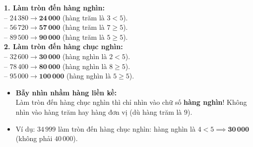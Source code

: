 \documentclass[11pt,a4paper]{article}
\begin{document}
\vspace{-2.5mm}
\noindent
\begin{minipage}[t]{0.49\textwidth}\vspace{0pt}
\begin{tcolorbox}[
  enhanced,
  colback=green!4!white,
  colframe=green!60!black,
  arc=2mm, boxrule=0.8pt,
  left=2mm, right=2mm, top=1.8mm, bottom=1.8mm,
  title={\footnotesize\bfseries\color{white}\faCheckCircle\ Ví dụ thực hành chuẩn mực}
]
{\footnotesize
\textbf{1. Làm tròn đến hàng nghìn:}\\
-- $24\,380 \to \mathbf{24\,000}$ (hàng trăm là $3 < 5$).\\
-- $56\,720 \to \mathbf{57\,000}$ (hàng trăm là $7 \ge 5$).\\
-- $89\,500 \to \mathbf{90\,000}$ (hàng trăm là $5 \ge 5$).\\
\textbf{2. Làm tròn đến hàng chục nghìn:}\\
-- $32\,600 \to \mathbf{30\,000}$ (hàng nghìn là $2 < 5$).\\
-- $78\,400 \to \mathbf{80\,000}$ (hàng nghìn là $8 \ge 5$).\\
-- $95\,000 \to \mathbf{100\,000}$ (hàng nghìn là $5 \ge 5$).
}
\end{tcolorbox}
\end{minipage}
\hfill
\begin{minipage}[t]{0.49\textwidth}\vspace{0pt}
\begin{tcolorbox}[
  enhanced,
  colback=red!4!white,
  colframe=red!70!black,
  arc=2mm, boxrule=0.8pt,
  left=2mm, right=2mm, top=1.8mm, bottom=1.8mm,
  title={\footnotesize\bfseries\color{white}\faExclamationTriangle\ Mẹo tránh bẫy trắc nghiệm}
]
{\footnotesize
\begin{itemize}\setlength{\itemsep}{1.5pt}\setlength{\leftskip}{-2.5mm}
  \item \textbf{Bẫy nhìn nhầm hàng liền kề:}\\
  Làm tròn đến hàng chục nghìn thì chỉ nhìn vào chữ số \textbf{hàng nghìn}! Không nhìn vào hàng trăm hay hàng đơn vị (dù hàng trăm là $9$).
  \item Ví dụ: $34\,999$ làm tròn đến hàng chục nghìn: hàng nghìn là $4 < 5 \implies \mathbf{30\,000}$ (không phải $40\,000$).
\end{itemize}
}
\end{tcolorbox}
\end{minipage}
\end{document}
